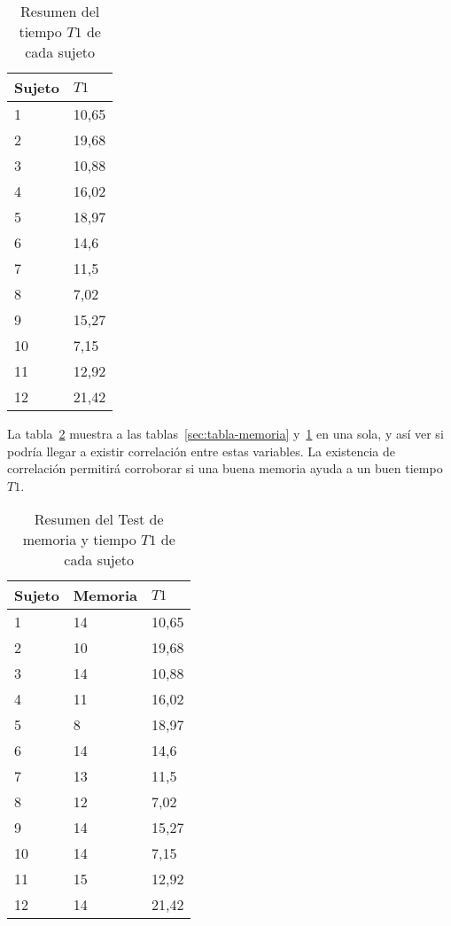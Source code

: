 \begin{table}[H]
\centering
\footnotesize
\begin{tabular}{|p{1.6cm}|p{1.6cm}|}
\hline
    Sujeto & $T1$ \\
    \hline 
    1 & 10,65 \\
    2 & 19,68 \\
    3 & 10,88 \\
    4 & 16,02 \\
    5 & 18,97 \\
    6 & 14,6 \\
    7 & 11,5 \\
    8 & 7,02 \\
    9 & 15,27 \\
    10 & 7,15 \\
    11 & 12,92 \\
    12 & 21,42 \\
\hline
\end{tabular}
\caption{Resumen del tiempo $T1$ de cada sujeto}
\label{sec:tabla-T1}
\end{table}

La tabla~\ref{sec:tabla-t1-memoria} muestra a las tablas~\ref{sec:tabla-memoria} y~\ref{sec:tabla-T1} en una
sola, y as\'i ver si podr\'ia llegar a existir correlaci\'on entre estas variables. La existencia 
de correlaci\'on permitir\'a corroborar si una buena memoria ayuda a un buen tiempo $T1$.

\begin{table}[H]
\centering
\footnotesize
\begin{tabular}{|p{1.6cm}|p{1.6cm}|p{1.6cm}|}
\hline
    Sujeto & Memoria & $T1$ \\
    \hline 
    1 & 14 & 10,65 \\
    2 & 10 & 19,68 \\
    3 & 14 & 10,88 \\
    4 & 11 & 16,02 \\
    5 & 8 & 18,97 \\
    6 & 14 & 14,6 \\
    7 & 13 & 11,5 \\
    8 & 12 & 7,02 \\
    9 & 14 & 15,27 \\
    10 & 14 & 7,15 \\
    11 & 15 & 12,92 \\
    12 & 14 & 21,42 \\
\hline
\end{tabular}
\caption{Resumen del Test de memoria y tiempo $T1$ de cada sujeto}
\label{sec:tabla-t1-memoria}
\end{table}

